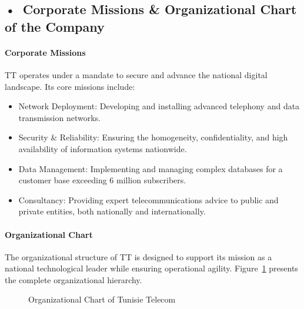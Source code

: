 \subsection*{\mbox{•}~Corporate Missions \& Organizational Chart of the Company}

\paragraph*{Corporate Missions}
TT\cite{Tunisie_Telecom} operates under a mandate to secure and advance the national digital landscape. Its core missions include:
\begin{itemize}
    \item Network Deployment: Developing and installing advanced telephony and data transmission networks.
    \item Security \& Reliability: Ensuring the homogeneity, confidentiality, and high availability of information systems nationwide.
    \item Data Management: Implementing and managing complex databases for a customer base exceeding 6 million subscribers.
    \item Consultancy: Providing expert telecommunications advice to public and private entities, both nationally and internationally.
\end{itemize}

\paragraph*{Organizational Chart}
The organizational structure of TT is designed to support its mission as a national technological leader while ensuring operational agility. Figure~\ref{fig:orgchart} presents the complete organizational hierarchy.

\begin{figure}[htbp]
    \centering
    \OrgTelecom
    \caption{Organizational Chart of Tunisie Telecom}
    \label{fig:orgchart}
\end{figure}

